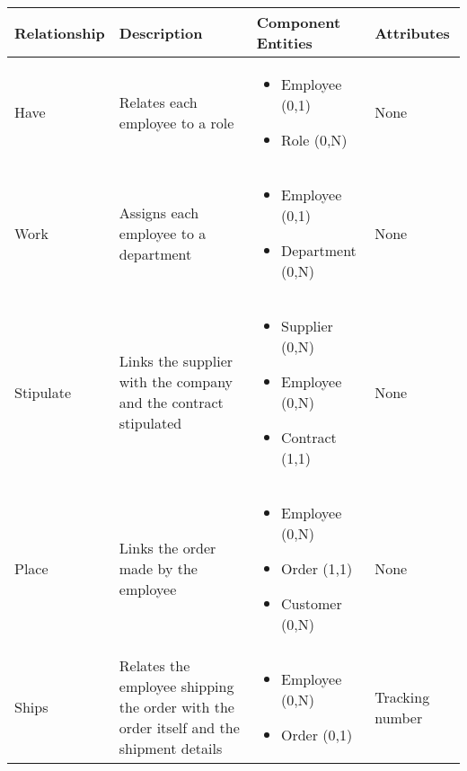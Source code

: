 \begin{longtable}{|p{}|p{} |p{}|p{} |} 
\hline
\textbf{Relationship} & \textbf{Description} & \textbf{Component Entities} & \textbf{Attributes} \\\hline


Have & Relates each employee to a role & \begin{itemize}
        \vspace{-1em}
        \item Employee (0,1)
        \item Role (0,N)
    \end{itemize}
 &  None \\\hline
 
Work & Assigns each employee to a department & \begin{itemize}
        \vspace{-1em}
        \item Employee (0,1)
        \item Department (0,N)
    \end{itemize}
 &  None \\\hline

Stipulate & Links the supplier with the company and the contract stipulated  & \begin{itemize}
	\vspace{-1em}
	\item Supplier (0,N) 
	\item Employee (0,N)
    \item Contract  (1,1)
	\end{itemize}
&  None\\\hline

Place & Links the order made by the employee & \begin{itemize}
	\vspace{-1em}
	\item Employee (0,N)
	\item Order (1,1)
	\item Customer (0,N)	
\end{itemize}
&  None \\\hline

Ships & Relates the employee shipping the order with the order itself and the shipment details & \begin{itemize}
	\vspace{-1em}
	\item Employee (0,N)
	\item Order (0,1)
\end{itemize}
&  Tracking number \\\hline


\end{longtable}
